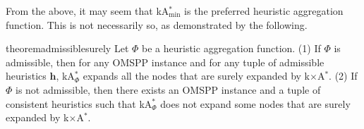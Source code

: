 \documentclass[smallextended]{svjour3}       %
\newcommand{\omspp}{\ac{OMSPP}\xspace}
\newcommand{\kastarvar}[1]{\textup{kA}$^*_{#1}$\xspace}
\newcommand{\kastarmin}{\kastarvar{\min}}
\newcommand{\kastarmax}{\kastarvar{\max}}
\newcommand{\kastarphi}{\textup{kA}$^*_{\Phi}$\xspace}
\newcommand{\kxastar}{k$\times$A$^*$\xspace}
\newcommand{\axiomadm}{admissible\xspace}
\newcommand{\vect}[1]{\mathbf{#1}}
\begin{document}
From the above, it may seem that \kastarmin is the preferred heuristic aggregation function. This is not necessarily so, as demonstrated by the following. 


\begin{restatable}{theorem}{admissiblesurely}
  \label{the:admissible-surely}
  Let $\Phi$ be a heuristic aggregation function.
  (1) If $\Phi$ is \axiomadm, then for any \omspp instance and for any tuple of admissible heuristics $\vect{h}$, \kastarphi expands all the nodes that are surely expanded by \kxastar.
  (2) If $\Phi$ is not \axiomadm, then there exists an \omspp instance and a tuple of consistent heuristics such that \kastarphi does not expand some nodes that are surely expanded by \kxastar.
\end{restatable}

\end{document}

